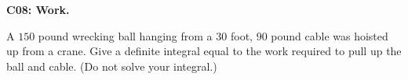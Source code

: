 \documentclass[12pt]{article}
\newcommand{\<}{\left\langle}
\renewcommand{\>}{\right\rangle}
\newcommand{\exerciseHeader}[4]{


  \vspace{0.5em}
  \textbf{#2}
  \vspace{0.5em}

}
\begin{document}
\begin{multicols}{2}
\exerciseHeader{2017 June 29}{C08: Work.}{
Express the work done in a system as a definite integral.
}{4/4}

A \(150\) pound wrecking ball hanging from a \(30\) foot, \(90\) pound
cable was hoisted up from a crane. Give a definite integral equal to the
work required to pull up the ball and cable.
(Do not solve your integral.)



%

%
%
%
%
%




\end{multicols}
\end{document}
